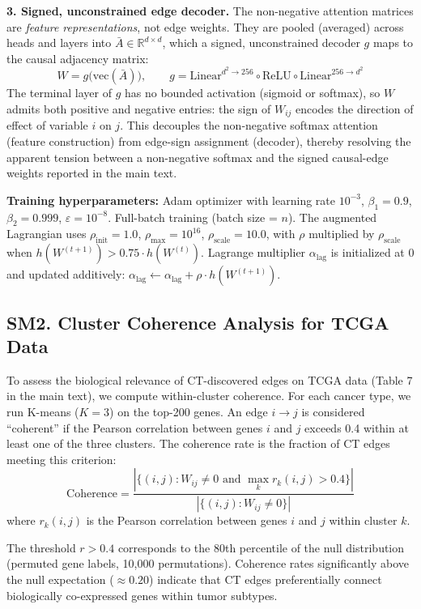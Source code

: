 \documentclass[12pt,a4paper]{article}
\begin{document}
\textbf{3. Signed, unconstrained edge decoder.} The non-negative attention matrices are \emph{feature representations}, not edge weights. They are pooled (averaged) across heads and layers into $\bar{A} \in \mathbb{R}^{d \times d}$, which a signed, unconstrained decoder $g$ maps to the causal adjacency matrix:
\[
W = g\big(\mathrm{vec}(\bar{A})\big), \qquad g = \mathrm{Linear}^{d^2 \to 256} \circ \mathrm{ReLU} \circ \mathrm{Linear}^{256 \to d^2}
\]
The terminal layer of $g$ has no bounded activation (sigmoid or softmax), so $W$ admits both positive and negative entries: the sign of $W_{ij}$ encodes the direction of effect of variable $i$ on $j$. This decouples the non-negative softmax attention (feature construction) from edge-sign assignment (decoder), thereby resolving the apparent tension between a non-negative softmax and the signed causal-edge weights reported in the main text.

\textbf{Training hyperparameters:} Adam optimizer with learning rate $10^{-3}$, $\beta_1 = 0.9$, $\beta_2 = 0.999$, $\varepsilon = 10^{-8}$. Full-batch training (batch size = $n$). The augmented Lagrangian uses $\rho_{\text{init}} = 1.0$, $\rho_{\text{max}} = 10^{16}$, $\rho_{\text{scale}} = 10.0$, with $\rho$ multiplied by $\rho_{\text{scale}}$ when $h(W^{(t+1)}) > 0.75 \cdot h(W^{(t)})$. Lagrange multiplier $\alpha_{\text{lag}}$ is initialized at 0 and updated additively: $\alpha_{\text{lag}} \leftarrow \alpha_{\text{lag}} + \rho \cdot h(W^{(t+1)})$.

\subsection*{SM2. Cluster Coherence Analysis for TCGA Data}
\label{sec:sm_coherence}

To assess the biological relevance of CT-discovered edges on TCGA data (Table 7 in the main text), we compute within-cluster coherence. For each cancer type, we run K-means ($K=3$) on the top-200 genes. An edge $i \to j$ is considered ``coherent'' if the Pearson correlation between genes $i$ and $j$ exceeds 0.4 within at least one of the three clusters. The coherence rate is the fraction of CT edges meeting this criterion:
\[
\text{Coherence} = \frac{|\{ (i,j) : W_{ij} \neq 0 \text{ and } \max_k r_k(i,j) > 0.4 \}|}{|\{ (i,j) : W_{ij} \neq 0 \}|}
\]
where $r_k(i,j)$ is the Pearson correlation between genes $i$ and $j$ within cluster $k$.

The threshold $r > 0.4$ corresponds to the 80th percentile of the null distribution (permuted gene labels, 10,000 permutations). Coherence rates significantly above the null expectation ($\approx 0.20$) indicate that CT edges preferentially connect biologically co-expressed genes within tumor subtypes.
\end{document}
